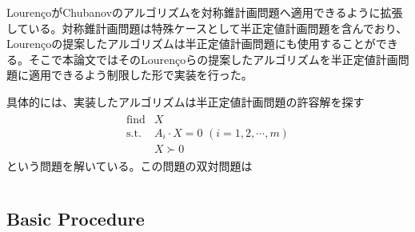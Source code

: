 Louren\c{c}oがChubanovのアルゴリズムを対称錐計画問題へ適用できるように拡張している\cite{SymmetricCone}。対称錐計画問題は特殊ケースとして半正定値計画問題を含んでおり、Louren\c{c}oの提案したアルゴリズムは半正定値計画問題にも使用することができる。そこで本論文ではそのLouren\c{c}oらの提案したアルゴリズムを半正定値計画問題に適用できるよう制限した形で実装を行った。

具体的には、実装したアルゴリズムは半正定値計画問題の許容解を探す
\begin{align*}
  \begin{array}{ll}
    \text{find} & X \\
    \text{s.t.} & A_i \cdot X = 0 \,\, (i = 1, 2, \cdots, m) \\
                & X \succ 0
  \end{array}
\end{align*}
という問題を解いている。この問題の双対問題は
\begin{align*}
  \begin{array}{ll}
  \end{array}
\end{align*}

\subsection{Basic Procedure}

